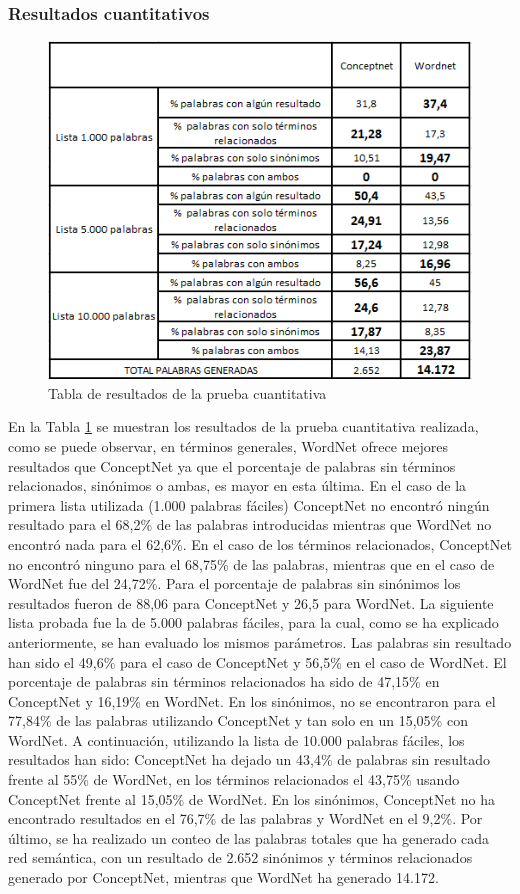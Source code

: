 \subsubsection{Resultados cuantitativos}
\label{cap:subsec:pruebaCuantitativa}
\begin{figure}[!h]
	\includegraphics[width=.8\textwidth]{Imagenes/Bitmap/Capitulo4/tabla_cuantitativa}
	\centering
	\caption{Tabla de resultados de la prueba cuantitativa}
	\label{fig:tabla_cuantitativa}
\end{figure}

En la Tabla \ref{fig:tabla_cuantitativa} se muestran los resultados de la prueba cuantitativa realizada, como se puede observar, en términos generales, WordNet ofrece mejores resultados que ConceptNet ya que el porcentaje de palabras sin términos relacionados, sinónimos o ambas, es mayor en esta última. En el caso de la primera lista utilizada (1.000 palabras fáciles) ConceptNet no encontró ningún resultado para el 68,2\% de las palabras introducidas mientras que WordNet no encontró nada para el 62,6\%. En el caso de los términos relacionados, ConceptNet no encontró ninguno para el 68,75\% de las palabras, mientras que en el caso de WordNet fue del 24,72\%. Para el porcentaje de palabras sin sinónimos los resultados fueron de 88,06 para ConceptNet y 26,5 para WordNet. La siguiente lista probada fue la de 5.000 palabras fáciles, para la cual, como se ha explicado anteriormente, se han evaluado los mismos parámetros. Las palabras sin resultado han sido el 49,6\% para el caso de ConceptNet y 56,5\% en el caso de WordNet. El porcentaje de palabras sin términos relacionados ha sido de 47,15\% en ConceptNet y 16,19\% en WordNet. En los sinónimos, no se encontraron para el 77,84\% de las palabras utilizando ConceptNet  y tan solo en un 15,05\% con WordNet. A continuación, utilizando la lista de 10.000 palabras fáciles, los resultados han sido: ConceptNet ha dejado un 43,4\% de palabras sin resultado frente al 55\% de WordNet, en los términos relacionados el 43,75\% usando ConceptNet  frente al 15,05\% de WordNet. En los sinónimos, ConceptNet no ha encontrado resultados en el 76,7\% de las palabras y WordNet en el 9,2\%. Por último, se ha realizado un conteo de las palabras totales que ha generado cada red semántica, con un resultado de 2.652 sinónimos y términos relacionados generado por ConceptNet, mientras que WordNet ha generado 14.172.



